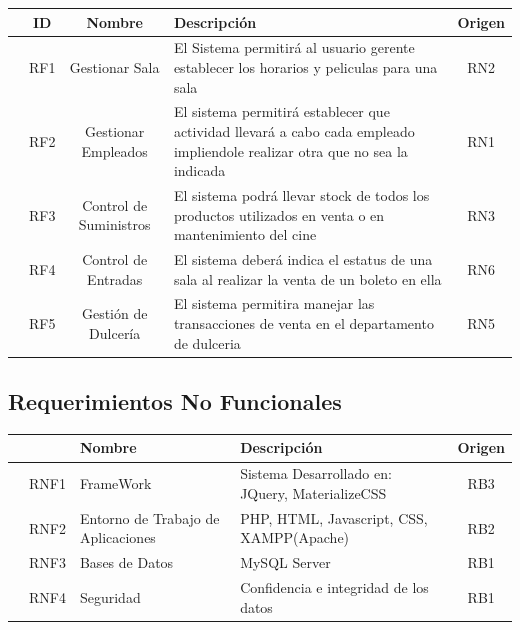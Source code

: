 \documentclass[12pt, fleqn]{report}                             %
\begin{document}
            \begin{tabular}{r ||c |c | m{15em} |c }
               &  ID & Nombre & Descripción & Origen \\ [0.5ex] 
               \hline\hline
              
                & RF1 & Gestionar Sala          &
                El Sistema permitirá al usuario gerente establecer los horarios y peliculas para una sala
                & RN2\\
                & RF2 & Gestionar Empleados     & 
                El sistema permitirá establecer que actividad llevará a cabo cada empleado impliendole
                realizar otra que no sea la indicada
                & RN1\\
                & RF3 & Control de Suministros  &
                El sistema podrá llevar stock de todos los productos utilizados en venta o en mantenimiento del cine
                & RN3\\
                & RF4 & Control de Entradas     &
                El sistema deberá indica el estatus de una sala al realizar la venta de un boleto en ella
                & RN6\\
                & RF5 & Gestión de Dulcería     & 
                El sistema permitira manejar las transacciones de venta en el departamento de dulceria
                & RN5\\
            \end{tabular}


        \subsection{Requerimientos No Funcionales}
            \begin{tabular}{r ||c |m{8em} | m{18em} |c }
               &   & Nombre & Descripción & Origen \\ [0.5ex] 
               \hline\hline
                & RNF1 & FrameWork &
                Sistema Desarrollado en: JQuery, MaterializeCSS
                & RB3\\

                & RNF2 & Entorno de Trabajo de Aplicaciones &
                PHP, HTML, Javascript, CSS, XAMPP(Apache)  
                & RB2\\

                & RNF3 & Bases de Datos & MySQL Server
                & RB1\\

                & RNF4 & Seguridad & Confidencia e integridad de los datos
                & RB1\\
            \end{tabular}
\end{document}
